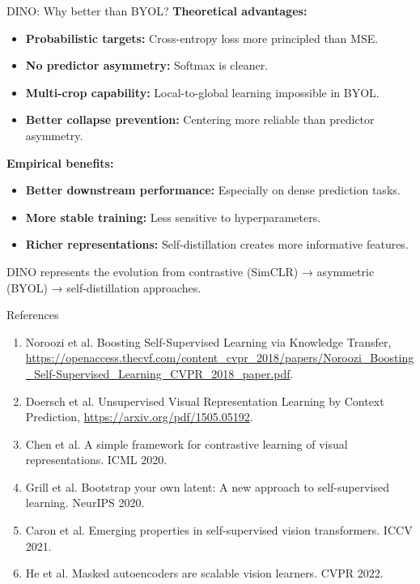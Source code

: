 \documentclass{beamer}
\begin{document}
\begin{frame}{DINO: Why better than BYOL?}
\textbf{Theoretical advantages:}
\begin{itemize}
\item \textbf{Probabilistic targets:} Cross-entropy loss more principled than MSE.
\item \textbf{No predictor asymmetry:} Softmax is cleaner.
\item \textbf{Multi-crop capability:} Local-to-global learning impossible in BYOL.
\item \textbf{Better collapse prevention:} Centering more reliable than predictor asymmetry.
\end{itemize}

\vspace{0.2cm}

\textbf{Empirical benefits:}
\begin{itemize}
\item \textbf{Better downstream performance:} Especially on dense prediction tasks.
\item \textbf{More stable training:} Less sensitive to hyperparameters.
\item \textbf{Richer representations:} Self-distillation creates more informative features.
\end{itemize}
\vspace{0.2cm}
\alert{DINO represents the evolution from contrastive (SimCLR) → asymmetric (BYOL) → self-distillation approaches.}
\end{frame}

\begin{frame}{References}
  \begin{enumerate}
  \item Noroozi et al. Boosting Self-Supervised Learning via
    Knowledge Transfer,
    \url{https://openaccess.thecvf.com/content_cvpr_2018/papers/Noroozi_Boosting_Self-Supervised_Learning_CVPR_2018_paper.pdf}.
  \item Doersch et al. Unsupervised Visual Representation Learning by Context Prediction, \url{https://arxiv.org/pdf/1505.05192}.
  \item Chen et al. A simple framework for contrastive learning of
    visual representations. ICML 2020.
  \item Grill et al. Bootstrap your own latent: A new approach to
    self-supervised learning. NeurIPS 2020.
  \item Caron et al. Emerging properties in self-supervised vision
    transformers. ICCV 2021.
  \item He et al. Masked autoencoders are scalable vision
    learners. CVPR 2022.
  \end{enumerate}
\end{frame}
\end{document}
